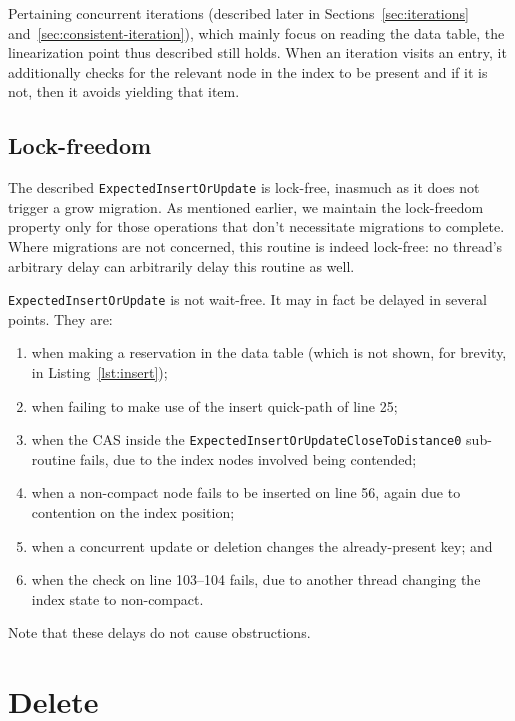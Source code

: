 Pertaining concurrent iterations (described later in Sections~\ref{sec:iterations} and~\ref{sec:consistent-iteration}), which mainly focus on reading the data table, the linearization point thus described still holds.
When an iteration visits an entry, it additionally checks for the relevant node in the index to be present and if it is not, then it avoids yielding that item.

\subsection{Lock-freedom}\label{subsec:insert-lock-freedom}

The described \texttt{ExpectedInsertOrUpdate} is lock-free, inasmuch as it does not trigger a grow migration.
As mentioned earlier, we maintain the lock-freedom property only for those operations that don't necessitate migrations to complete.
Where migrations are not concerned, this routine is indeed lock-free: no thread's arbitrary delay can arbitrarily delay this routine as well.

\texttt{ExpectedInsertOrUpdate} is not wait-free.
It may in fact be delayed in several points.
They are:
\begin{enumerate}
    \item when making a reservation in the data table (which is not shown, for brevity, in Listing~\ref{lst:insert});
    \item when failing to make use of the insert quick-path of line 25;
    \item when the CAS inside the \texttt{ExpectedInsertOrUpdateCloseToDistance0} sub-routine fails, due to the index nodes involved being contended;
    \item when a non-compact node fails to be inserted on line 56, again due to contention on the index position;
    \item when a concurrent update or deletion changes the already-present key; and
    \item when the check on line 103--104 fails, due to another thread changing the index state to non-compact.
\end{enumerate}
Note that these delays do not cause obstructions.





\section{Delete}\label{sec:delete}

